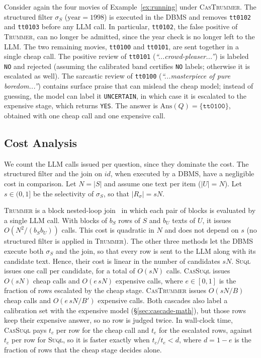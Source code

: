 \documentclass[sigconf]{acmart}
\begin{document}
\begin{example}
Consider again the four movies of Example~\ref{ex:running} under \textsc{CasTrummer}. The structured filter $\sigma_S$ ($\text{year}=1998$) is executed in the DBMS and removes \texttt{tt0102} and \texttt{tt0103} before any LLM call. In particular, \texttt{tt0102}, the false positive of \textsc{Trummer}, can no longer be admitted, since the year check is no longer left to the LLM. The two remaining movies, \texttt{tt0100} and \texttt{tt0101}, are sent together in a single cheap call. The positive review of \texttt{tt0101} (\textit{``...crowd-pleaser...''}) is labeled \texttt{NO} and rejected (assuming the calibrated band certifies \texttt{NO} labels; otherwise it is escalated as well). The sarcastic review of \texttt{tt0100} (\textit{``...masterpiece of pure boredom...''}) contains surface praise that can mislead the cheap model; instead of guessing, the model can label it \texttt{UNCERTAIN}, in which case it is escalated to the expensive stage, which returns \texttt{YES}. The answer is $\mathrm{Ans}(Q)=\{\mathtt{tt0100}\}$, obtained with one cheap call and one expensive call.
\end{example}

\subsection{Cost Analysis}
\label{sec:cost}
We count the LLM calls issued per question, since they dominate the cost. The structured filter and the join on $\mathit{id}$, when executed by a DBMS, have a negligible cost in comparison. Let $N = |S|$ and assume one text per item ($|U| = N$). Let $s \in (0,1]$ be the selectivity of $\sigma_S$, so that $|R_\sigma| = sN$.

\textsc{Trummer} is a block nested-loop join~\cite{garcia2008database,ramakrishnan2003database} in which each pair of blocks is evaluated by a single LLM call. With blocks of $b_S$ rows of $S$ and $b_U$ texts of $U$, it issues $O(N^2/(b_S b_U))$ calls. This cost is quadratic in $N$ and does not depend on $s$ (no structured filter is applied in \textsc{Trummer}). The other three methods let the DBMS execute both $\sigma_S$ and the join, so that every row is sent to the LLM along with its candidate text. Hence, their cost is linear in the number of candidates $sN$. \textsc{Suql} issues one call per candidate, for a total of $O(sN)$ calls. \textsc{CasSuql} issues $O(sN)$ cheap calls and $O(e\,sN)$ expensive calls, where $e \in [0,1]$ is the fraction of rows escalated by the cheap stage. \textsc{CasTrummer} issues $O(sN/B)$ cheap calls and $O(e\,sN/B')$ expensive calls. Both cascades also label a calibration set with the expensive model (\S\ref{sec:cascade-math}), but those rows keep their expensive answer, so no row is judged twice. In wall-clock time, \textsc{CasSuql} pays $t_c$ per row for the cheap call and $t_e$ for the escalated rows, against $t_e$ per row for \textsc{Suql}, so it is faster exactly when $t_c/t_e < d$, where $d = 1-e$ is the fraction of rows that the cheap stage decides alone.
\end{document}
